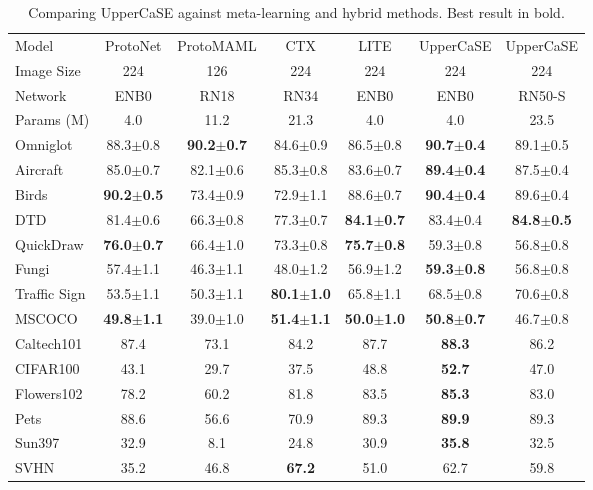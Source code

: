 \documentclass{article}
\begin{document}
\begin{table}[H]
\caption{Comparing UpperCaSE against meta-learning and hybrid methods. Best result in bold.}
\vskip 0.15in
\begin{center}
\begin{small}
\begin{tabular}{lcccccc}
\toprule
Model & ProtoNet & ProtoMAML & CTX & LITE & UpperCaSE & UpperCaSE \\
Image Size & 224 & 126 & 224 & 224 & 224 & 224\\
Network & ENB0 & RN18 & RN34 & ENB0 & ENB0 & RN50-S \\
Params (M) & 4.0 & 11.2 & 21.3 & 4.0 & 4.0 & 23.5 \\
\midrule
Omniglot & 88.3$\pm$0.8 & \textbf{90.2$\pm$0.7} & 84.6$\pm$0.9 & 86.5$\pm$0.8 & \textbf{90.7$\pm$0.4} & 89.1$\pm$0.5\\
Aircraft & 85.0$\pm$0.7 & 82.1$\pm$0.6 & 85.3$\pm$0.8 & 83.6$\pm$0.7 & \textbf{89.4$\pm$0.4} & 87.5$\pm$0.4\\
Birds & \textbf{90.2$\pm$0.5} & 73.4$\pm$0.9 & 72.9$\pm$1.1 & 88.6$\pm$0.7 & \textbf{90.4$\pm$0.4} & 89.6$\pm$0.4\\
DTD & 81.4$\pm$0.6 & 66.3$\pm$0.8 & 77.3$\pm$0.7 & \textbf{84.1$\pm$0.7} & 83.4$\pm$0.4 & \textbf{84.8$\pm$0.5}\\
QuickDraw & \textbf{76.0$\pm$0.7} & 66.4$\pm$1.0 & 73.3$\pm$0.8 & \textbf{75.7$\pm$0.8} & 59.3$\pm$0.8 & 56.8$\pm$0.8\\
Fungi & 57.4$\pm$1.1 & 46.3$\pm$1.1 & 48.0$\pm$1.2 & 56.9$\pm$1.2 & \textbf{59.3$\pm$0.8} & 56.8$\pm$0.8\\
Traffic Sign & 53.5$\pm$1.1 & 50.3$\pm$1.1 & \textbf{80.1$\pm$1.0} & 65.8$\pm$1.1 & 68.5$\pm$0.8 & 70.6$\pm$0.8\\
MSCOCO & \textbf{49.8$\pm$1.1} & 39.0$\pm$1.0 & \textbf{51.4$\pm$1.1} & \textbf{50.0$\pm$1.0} & \textbf{50.8$\pm$0.7} & 46.7$\pm$0.8\\
\midrule
Caltech101 & 87.4 & 73.1 & 84.2 & 87.7 & \textbf{88.3} & 86.2\\
CIFAR100 & 43.1 & 29.7 & 37.5 & 48.8 & \textbf{52.7} & 47.0\\
Flowers102 & 78.2 & 60.2 & 81.8 & 83.5 & \textbf{85.3} & 83.0\\
Pets & 88.6 & 56.6 & 70.9 & 89.3 & \textbf{89.9} & 89.3\\
Sun397 & 32.9 & 8.1 & 24.8 & 30.9 & \textbf{35.8} & 32.5\\
SVHN & 35.2 & 46.8 & \textbf{67.2} & 51.0 & 62.7 & 59.8\\

\end{tabular}
\end{small}
\end{center}
\end{table}
\end{document}
